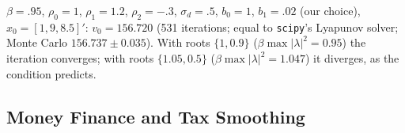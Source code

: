 \documentclass[12pt, letterpaper]{article}
\begin{document}
\begin{tcolorbox}[evenbox,title={Exercise 5.6 \quad Finding the state is an art}]
\begin{tcolorbox}[databox]
$\beta=.95$, $\rho_0=1$, $\rho_1=1.2$, $\rho_2=-.3$, $\sigma_d=.5$, $b_0=1$, $b_1=.02$ (our choice),
$x_0=[1,9,8.5]'$: $v_0=156.720$ (531 iterations; equal to \texttt{scipy}'s Lyapunov solver; Monte Carlo
$156.737\pm0.035$). With roots $\{1,0.9\}$ ($\beta\max|\lambda|^2=0.95$) the iteration converges;
with roots $\{1.05,0.5\}$ ($\beta\max|\lambda|^2=1.047$) it diverges, as the condition predicts.
\end{tcolorbox}
\end{tcolorbox}

\subsection{Money Finance and Tax Smoothing}
\end{document}
